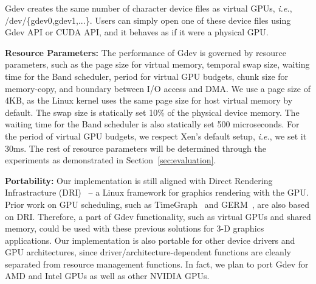 Gdev creates the same number of character device files as virtual GPUs,
\textit{i.e.}, /dev/\{gdev0,gdev1,...\}.
Users can simply open one of these device files using Gdev API or CUDA
API, and it behaves as if it were a physical GPU.

\textbf{Resource Parameters:}
The performance of Gdev is governed by resource parameters, such as the
page size for virtual memory, temporal swap size, waiting time for the
Band scheduler, period for virtual GPU budgets, chunk size
for memory-copy, and boundary between I/O access and DMA.
We use a page size of 4KB, as the Linux kernel uses the same page size
for host virtual memory by default.
The swap size is statically set 10\% of the physical device memory.
The waiting time for the Band scheduler is also statically set 500
microseconds.
For the period of virtual GPU budgets, we respect Xen's default setup,
\textit{i.e.}, we set it 30ms.
The rest of resource parameters will be determined through the experiments as
demonstrated in Section~\ref{sec:evaluation}.

\textbf{Portability:}
Our implementation is still aligned with Direct Rendering Infrastracture
(DRI)~\cite{DRI} -- a Linux framework for graphics rendering with the GPU.
Prior work on GPU scheduling, such as TimeGraph~\cite{Kato_ATC11} and
GERM~\cite{Bautin_MCNC08}, are also based on DRI.
Therefore, a part of Gdev functionality, such as virtual GPUs and shared
memory, could be used with these previous solutions for 3-D graphics
applications.
Our implementation is also portable for other device drivers and GPU
architectures, since driver/architecture-dependent functions are cleanly
separated from resource management functions.
In fact, we plan to port Gdev for AMD and Intel GPUs as well as other
NVIDIA GPUs.
